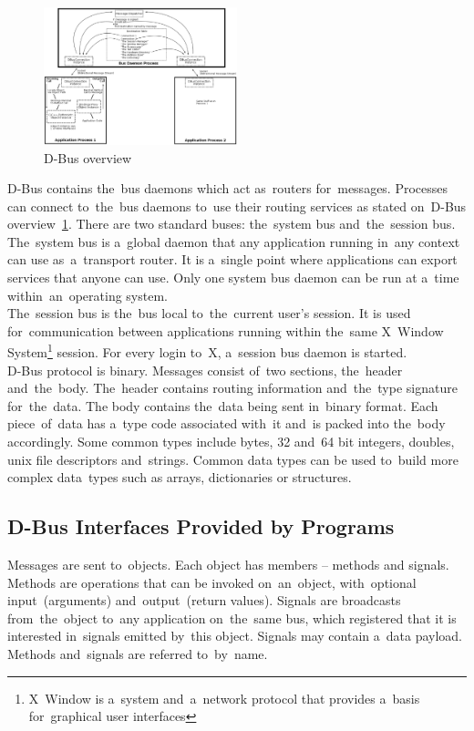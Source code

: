 \documentclass[conference]{IEEEtran}
\begin{document}
\begin{figure}[h]
\centering
\caption{D-Bus overview~\cite{DBUS}}
\label{fig:dbus_image}
\includegraphics[width=0.5\textwidth]{dbus_diagram.eps}
\end{figure}


D-Bus contains the~bus daemons which act as~routers for~messages. Processes
can connect to~the~bus daemons to~use their routing services as stated on~D-Bus
overview~\ref{fig:dbus_image}. There are two standard buses: the~system bus
and~the~session bus.\\

The~system bus is a~global daemon that any application running in~any
context can use as~a~transport router. It is a~single point where applications
can export services that anyone can use. Only one system bus daemon
can be run at a~time within~an~operating system.\\

The~session bus is the~bus local to~the~current user's session. It is used
for~communication between applications running within the~same X~Window System\footnote{X~Window is a~system and~a~network protocol that provides a~basis
for~graphical user interfaces} session. For every login to~X, a~session bus
daemon is started.\\

D-Bus protocol is binary. Messages consist of~two sections, the~header
and~the~body. The~header contains routing information and~the~type signature
for~the~data. The body contains the~data being sent in~binary format. Each
piece~of~data has a~type code \mbox{associated} with~it and~is packed into the~body
accordingly. Some common types include bytes, 32 and~64 bit integers, doubles,
unix file descriptors and~strings. Common data types can be used to~build more
complex data~types such as arrays, dictionaries or structures.

\subsection{D-Bus Interfaces Provided by Programs}
Messages are sent to~objects. Each object has members -- methods and signals.
Methods are operations that can be invoked on~an~object, with~optional input~(arguments) and~output~(return values).
Signals are broadcasts from~the~object to~any application on~the~same bus, which
registered that it is interested in~signals emitted by~this object. Signals may
contain a~data payload. Methods and~signals are referred to~by~name.
\end{document}

